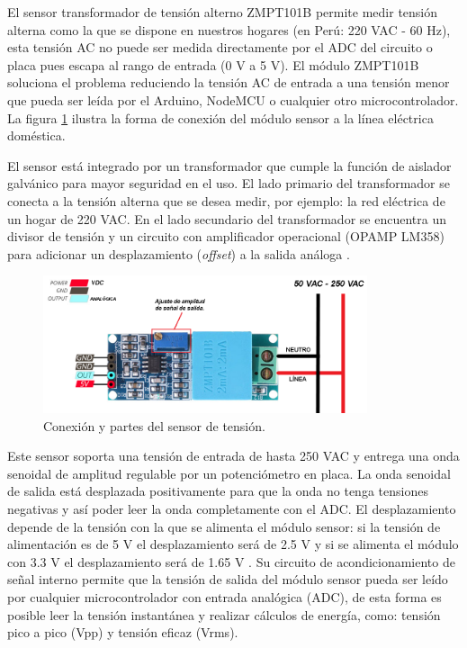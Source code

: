 El sensor transformador de tensión alterno ZMPT101B permite medir tensión alterna como la que se dispone en nuestros hogares (en Perú: 220 VAC - 60 Hz), esta tensión AC no puede ser medida directamente por el ADC del circuito o placa pues escapa al rango de entrada (0 V a 5 V). El módulo ZMPT101B soluciona el problema reduciendo la tensión AC de entrada a una tensión menor que pueda ser leída por el Arduino, NodeMCU o cualquier otro microcontrolador. La figura \ref{fig:sensortension} ilustra la forma de conexión del módulo sensor a la línea eléctrica doméstica.

El sensor está integrado por un transformador que cumple la función de aislador galvánico para mayor seguridad en el uso. El lado primario del transformador se conecta a la tensión alterna que se desea medir, por ejemplo: la red eléctrica de un hogar de 220 VAC. En el lado secundario del transformador se encuentra un divisor de tensión y un circuito con amplificador operacional (OPAMP LM358) para adicionar un desplazamiento (\emph{offset}) a la salida análoga \citep{WEBSITE:22}. 

\begin{figure}[htpb]
\centering 
\includegraphics[width=0.85\textwidth]{./Figures/sensortension.png}
\caption{Conexión y partes del sensor de tensión.}
\label{fig:sensortension}
\end{figure}


Este sensor soporta una tensión de entrada de hasta 250 VAC y entrega una onda senoidal de amplitud regulable por un potenciómetro en placa. La onda senoidal de salida está desplazada positivamente para que la onda no tenga tensiones negativas y así poder leer la onda completamente con el ADC. El desplazamiento depende de la tensión con la que se alimenta el módulo sensor: si la tensión de alimentación es de 5 V el desplazamiento será de 2.5 V y si se alimenta el módulo con 3.3 V el desplazamiento será de 1.65 V \citep{WEBSITE:23}. Su circuito de acondicionamiento de señal interno permite que la tensión de salida del módulo sensor pueda ser leído por cualquier microcontrolador con entrada analógica (ADC), de esta forma es posible leer la tensión instantánea y realizar cálculos de energía, como: tensión pico a pico (Vpp) y tensión eficaz (Vrms). 


